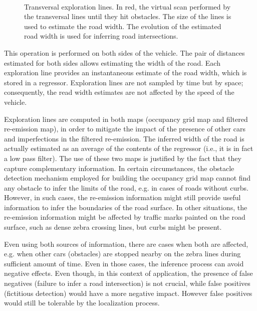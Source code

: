 \begin{figure}[t]
	\centering
	\\
	\caption{Transversal exploration lines. In red, the virtual scan performed by the transversal lines until they hit obstacles. The size of the lines is used to estimate the road width. The evolution of the estimated road width is used for inferring road intersections.}
	\label{Fig::FIGURE_ROAD_SIZE}
\end{figure}

This operation is performed on both sides of the vehicle. The pair of distances estimated for both sides allows estimating the width of the road. Each exploration line provides an instantaneous estimate of the road width, which is stored in a regressor. Exploration lines are not sampled by time but by space; consequently, the read width estimates are not affected by the speed of the vehicle.

Exploration lines are computed in both maps (occupancy grid map and filtered re-emission map), in order to mitigate the impact of the presence of other cars and imperfections in the filtered re-emission. The inferred width of the road is actually estimated as an average of the contents of the regressor (i.e., it is in fact a low pass filter). The use of these two maps is justified by the fact that they capture complementary information. In certain circumstances, the obstacle detection mechanism employed for building the occupancy grid  map cannot find any obstacle to infer the limits of the road, e.g. in cases of roads without curbs. However, in such cases, the re-emission information might still provide useful information to infer the boundaries of the road surface. In other situations, the re-emission information might be affected by traffic marks painted on the road surface, such as dense zebra crossing lines, but curbs might be present.

Even using both sources of information, there are cases when both are affected, e.g. when other cars (obstacles) are stopped nearby on the zebra lines during sufficient amount of time. Even in those cases, the inference process can avoid negative effects. Even though, in this context of application, the presence of false negatives (failure to infer a road intersection) is not crucial, while false positives (fictitious detection) would have a more negative impact. However false positives would still be tolerable by the localization process.

